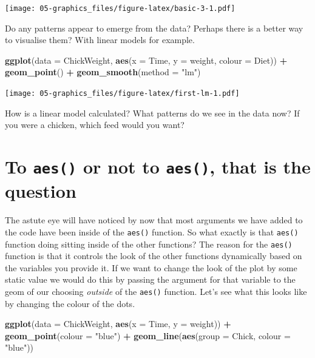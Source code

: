 \documentclass[
]{book}
\newenvironment{Shaded}{\begin{snugshade}}{\end{snugshade}}
\newcommand{\DataTypeTok}[1]{\textcolor[rgb]{0.13,0.29,0.53}{#1}}
\newcommand{\KeywordTok}[1]{\textcolor[rgb]{0.13,0.29,0.53}{\textbf{#1}}}
\newcommand{\NormalTok}[1]{#1}
\newcommand{\OperatorTok}[1]{\textcolor[rgb]{0.81,0.36,0.00}{\textbf{#1}}}
\newcommand{\StringTok}[1]{\textcolor[rgb]{0.31,0.60,0.02}{#1}}
\begin{document}
\texttt{[image: 05-graphics\_files/figure-latex/basic-3-1.pdf]}

Do any patterns appear to emerge from the data? Perhaps there is a better way to visualise them? With linear models for example.

\begin{Shaded}
\begin{Highlighting}[]
\KeywordTok{ggplot}\NormalTok{(}\DataTypeTok{data =}\NormalTok{ ChickWeight, }\KeywordTok{aes}\NormalTok{(}\DataTypeTok{x =}\NormalTok{ Time, }\DataTypeTok{y =}\NormalTok{ weight, }\DataTypeTok{colour =}\NormalTok{ Diet)) }\OperatorTok{+}
\StringTok{  }\KeywordTok{geom\_point}\NormalTok{() }\OperatorTok{+}
\StringTok{  }\KeywordTok{geom\_smooth}\NormalTok{(}\DataTypeTok{method =} \StringTok{"lm"}\NormalTok{)}
\end{Highlighting}
\end{Shaded}

\texttt{[image: 05-graphics\_files/figure-latex/first-lm-1.pdf]}

How is a linear model calculated? What patterns do we see in the data now? If you were a chicken, which feed would you want?

\hypertarget{to-aes-or-not-to-aes-that-is-the-question}{%
\section{\texorpdfstring{To \texttt{aes()} or not to \texttt{aes()}, that is the question}{To aes() or not to aes(), that is the question}}\label{to-aes-or-not-to-aes-that-is-the-question}}

The astute eye will have noticed by now that most arguments we have added to the code have been inside of the \texttt{aes()} function. So what exactly is that \texttt{aes()} function doing sitting inside of the other functions? The reason for the \texttt{aes()} function is that it controls the look of the other functions dynamically based on the variables you provide it. If we want to change the look of the plot by some static value we would do this by passing the argument for that variable to the geom of our choosing \emph{outside} of the \texttt{aes()} function. Let's see what this looks like by changing the colour of the dots.

\begin{Shaded}
\begin{Highlighting}[]
\KeywordTok{ggplot}\NormalTok{(}\DataTypeTok{data =}\NormalTok{ ChickWeight, }\KeywordTok{aes}\NormalTok{(}\DataTypeTok{x =}\NormalTok{ Time, }\DataTypeTok{y =}\NormalTok{ weight)) }\OperatorTok{+}
\StringTok{  }\KeywordTok{geom\_point}\NormalTok{(}\DataTypeTok{colour =} \StringTok{"blue"}\NormalTok{) }\OperatorTok{+}
\StringTok{  }\KeywordTok{geom\_line}\NormalTok{(}\KeywordTok{aes}\NormalTok{(}\DataTypeTok{group =}\NormalTok{ Chick, }\DataTypeTok{colour =} \StringTok{"blue"}\NormalTok{))}
\end{Highlighting}
\end{Shaded}
\end{document}
